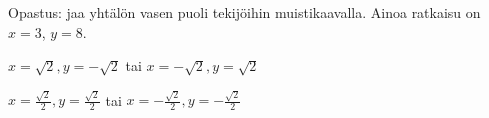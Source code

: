 \begin{Vastaus}{92}
    Opastus: jaa yhtälön vasen puoli tekijöihin muistikaavalla.
    Ainoa ratkaisu on $x = 3$, $y=8$.
    
\end{Vastaus}
\begin{Vastaus}{93}
        $x=\sqrt{2}, y=-\sqrt{2}$ tai $x=-\sqrt{2}, y=\sqrt{2}$
    
\end{Vastaus}
\begin{Vastaus}{94}
        $x=\frac{\sqrt{2}}{2}, y=\frac{\sqrt{2}}{2}$ tai $x=-\frac{\sqrt{2}}{2}, y=-\frac{\sqrt{2}}{2}$
    
\end{Vastaus}
